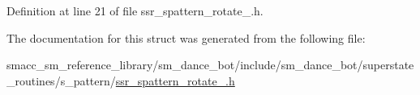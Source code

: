 Definition at line 21 of file ssr\+\_\+spattern\+\_\+rotate\+\_.\+h.




The documentation for this struct was generated from the following file\+:\begin{DoxyCompactItemize}
\item 
smacc\+\_\+sm\+\_\+reference\+\_\+library/sm\+\_\+dance\+\_\+bot/include/sm\+\_\+dance\+\_\+bot/superstate\+\_\+routines/s\+\_\+pattern/\hyperlink{ssr__spattern__rotate__2_8h}{ssr\+\_\+spattern\+\_\+rotate\+\_.\+h}\end{DoxyCompactItemize}
